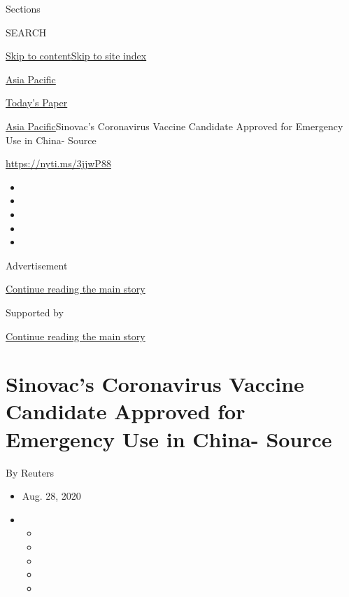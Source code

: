 Sections

SEARCH

\protect\hyperlink{site-content}{Skip to
content}\protect\hyperlink{site-index}{Skip to site index}

\href{https://www.nytimes3xbfgragh.onion/section/world/asia}{Asia
Pacific}

\href{https://myaccount.nytimes3xbfgragh.onion/auth/login?response_type=cookie\&client_id=vi}{}

\href{https://www.nytimes3xbfgragh.onion/section/todayspaper}{Today's
Paper}

\href{/section/world/asia}{Asia Pacific}\textbar{}Sinovac's Coronavirus
Vaccine Candidate Approved for Emergency Use in China- Source

\url{https://nyti.ms/3jjwP88}

\begin{itemize}
\item
\item
\item
\item
\item
\end{itemize}

Advertisement

\protect\hyperlink{after-top}{Continue reading the main story}

Supported by

\protect\hyperlink{after-sponsor}{Continue reading the main story}

\hypertarget{sinovacs-coronavirus-vaccine-candidate-approved-for-emergency-use-in-china--source}{%
\section{Sinovac's Coronavirus Vaccine Candidate Approved for Emergency
Use in China-
Source}\label{sinovacs-coronavirus-vaccine-candidate-approved-for-emergency-use-in-china--source}}

By Reuters

\begin{itemize}
\item
  Aug. 28, 2020
\item
  \begin{itemize}
  \item
  \item
  \item
  \item
  \item
  \end{itemize}
\end{itemize}

